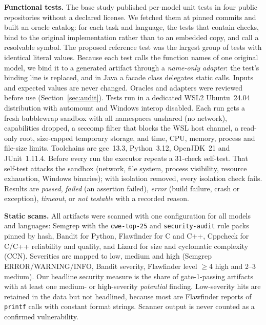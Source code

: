 \documentclass[conference]{IEEEtran}
\begin{document}
\textbf{Functional tests.} The base study published per-model unit tests in
four public repositories without a declared license. We fetched them at pinned
commits and built an oracle catalog: for each task and language, the tests
that contain checks, bind to the original implementation rather than to an
embedded copy, and call a resolvable symbol. The proposed reference test was
the largest group of tests with identical literal values. Because each test
calls the function names of one original model, we bind it to a generated
artifact through a \emph{name-only adapter}: the test's binding line is
replaced, and in Java a facade class delegates static calls. Inputs and
expected values are never changed. Oracles and adapters were reviewed before
use (Section~\ref{sec:audit}). Tests run in a dedicated WSL2 Ubuntu~24.04
distribution with automount and Windows interop disabled. Each run gets a fresh
bubblewrap \cite{bubblewrap} sandbox with all namespaces unshared (no network),
capabilities dropped, a seccomp filter that blocks the WSL host channel, a
read-only root, size-capped temporary storage, and time, CPU, memory, process
and file-size limits. Toolchains are gcc~13.3, Python~3.12, OpenJDK~21 and
JUnit~1.11.4. Before every run the executor repeats a 31-check self-test.
That self-test attacks the sandbox (network, file system, process visibility,
resource exhaustion, Windows binaries); with isolation removed, every isolation
check fails. Results are \emph{passed}, \emph{failed} (an assertion failed),
\emph{error} (build failure, crash or exception), \emph{timeout}, or
\emph{not testable} with a recorded reason.

\textbf{Static scans.} All \nScannedArtifacts{} artifacts were scanned with one
configuration for all models and languages: Semgrep \verSemgrep{}
\cite{semgrep} with the \texttt{cwe-top-25} and \texttt{security-audit} rule
packs pinned by hash, Bandit \verBandit{} \cite{bandit} for Python, Flawfinder
\verFlawfinder{} \cite{flawfinder} for C and C++, Cppcheck \verCppcheck{}
\cite{cppcheck} for C/C++ reliability and quality, and Lizard \verLizard{}
\cite{lizard} for size and cyclomatic complexity (CCN). Severities are mapped to
low, medium and high (Semgrep ERROR/WARNING/INFO, Bandit severity, Flawfinder
level $\geq$4 high and 2--3 medium). Our headline security measure is the share
of gate-1-passing artifacts with at least one medium- or high-severity
\emph{potential} finding. Low-severity hits are retained in the data but not
headlined, because most are Flawfinder reports of \texttt{printf} calls with
constant format strings. Scanner output is never counted as a confirmed
vulnerability.
\end{document}
